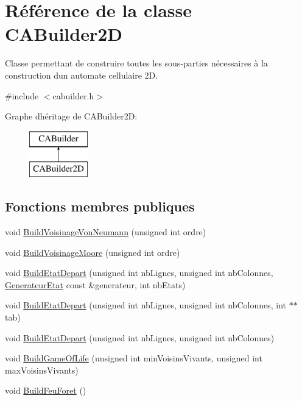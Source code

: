 \hypertarget{class_c_a_builder2_d}{}\section{Référence de la classe C\+A\+Builder2D}
\label{class_c_a_builder2_d}


Classe permettant de construire toutes les sous-\/parties nécessaires à la construction d\textquotesingle{}un automate cellulaire 2D.  




{\ttfamily \#include $<$cabuilder.\+h$>$}

Graphe d\textquotesingle{}héritage de C\+A\+Builder2D\+:\begin{figure}[H]
\begin{center}
\leavevmode
\includegraphics[height=2.000000cm]{class_c_a_builder2_d}
\end{center}
\end{figure}
\subsection*{Fonctions membres publiques}
\begin{DoxyCompactItemize}
\item 
void \mbox{\hyperlink{class_c_a_builder2_d_a0d31f87b74b5058fc60edd47ec372828}{Build\+Voisinage\+Von\+Neumann}} (unsigned int ordre)
\item 
void \mbox{\hyperlink{class_c_a_builder2_d_abafd86f26de9ab72100212edc23fc7fc}{Build\+Voisinage\+Moore}} (unsigned int ordre)
\item 
void \mbox{\hyperlink{class_c_a_builder2_d_af1b276f92d8dd9a914d123b16cc518c7}{Build\+Etat\+Depart}} (unsigned int nb\+Lignes, unsigned int nb\+Colonnes, \mbox{\hyperlink{class_generateur_etat}{Generateur\+Etat}} const \&generateur, int nb\+Etats)
\item 
void \mbox{\hyperlink{class_c_a_builder2_d_aa447c4c66f830ea0dd552592eb606336}{Build\+Etat\+Depart}} (unsigned int nb\+Lignes, unsigned int nb\+Colonnes, int $\ast$$\ast$tab)
\item 
void \mbox{\hyperlink{class_c_a_builder2_d_a7300ec839baa5de1d8c3b9a044b6c3cb}{Build\+Etat\+Depart}} (unsigned int nb\+Lignes, unsigned int nb\+Colonnes)
\item 
void \mbox{\hyperlink{class_c_a_builder2_d_ac8a0719a1a51bfbc40f017808b4c05ed}{Build\+Game\+Of\+Life}} (unsigned int min\+Voisins\+Vivants, unsigned int max\+Voisins\+Vivants)
\item 
void \mbox{\hyperlink{class_c_a_builder2_d_a71f988b3a445b18248661fc4c890a3a0}{Build\+Feu\+Foret}} ()
\end{DoxyCompactItemize}
